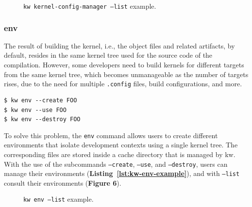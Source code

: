 \begin{figure}[htbp]
    \centering
    \caption{\texttt{kw kernel-config-manager --list} example.}
    \label{fig:patchset-dev-workflow}
\end{figure}

\subsubsection{env}

The result of building the kernel, i.e., the object files and related artifacts,
by default, resides in the same kernel tree used for the source code of the
compilation. However, some developers need to build kernels for different
targets from the same kernel tree, which becomes unmanageable as the number of
targets rises, due to the need for multiple \texttt{.config} files, build
configurations, and more.

\begin{lstlisting}[caption={\texttt{kw env} use case.}, label={lst:kw-env-example}]
$ kw env --create FOO
$ kw env --use FOO
$ kw env --destroy FOO
\end{lstlisting}

To solve this problem, the \texttt{env} command allows users to create different
environments that isolate development contexts using a single kernel tree. The
corresponding files are stored inside a cache directory that is managed by kw.
With the use of the subcommands \texttt{--create}, \texttt{--use}, and
\texttt{--destroy}, users can manage their environments
(\textbf{Listing~\ref{lst:kw-env-example}}), and with \texttt{--list} consult
their environments (\textbf{Figure 6}).

\begin{figure}[htbp]
    \centering
    \caption{\texttt{kw env --list} example.}
    \label{fig:patchset-dev-workflow}
\end{figure}

